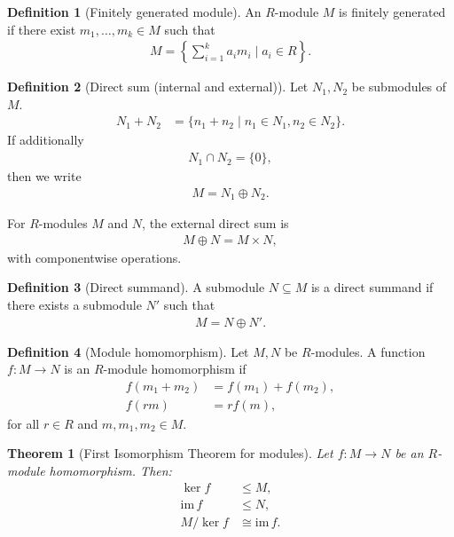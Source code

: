 \documentclass[titlepage]{article}
\theoremstyle{plain}
\newtheorem{theorem}{Theorem}[section]
\theoremstyle{definition}
\newtheorem{definition}{Definition}[section]
\theoremstyle{remark}
\theoremstyle{exercise-style}
\numberwithin{equation}{section}
\numberwithin{theorem}{section}
\numberwithin{remark}{section}
\begin{document}
\begin{definition}[Finitely generated module]
An $R$-module $M$ is finitely generated if there exist $m_1,\dots,m_k \in M$ such that
\begin{align}
M = \left\{ \sum_{i=1}^k a_i m_i \mid a_i \in R \right\}.
\end{align}
\end{definition}

\begin{definition}[Direct sum (internal and external)]
Let $N_1, N_2$ be submodules of $M$.
\begin{align}
N_1 + N_2 &= \{n_1 + n_2 \mid n_1 \in N_1, n_2 \in N_2\}.
\end{align}
If additionally
\begin{align}
N_1 \cap N_2 = \{0\},
\end{align}
then we write
\begin{align}
M = N_1 \oplus N_2.
\end{align}

For $R$-modules $M$ and $N$, the external direct sum is
\begin{align}
M \oplus N = M \times N,
\end{align}
with componentwise operations.
\end{definition}

\begin{definition}[Direct summand]
A submodule $N \subseteq M$ is a direct summand if there exists a submodule $N'$ such that
\begin{align}
M = N \oplus N'.
\end{align}
\end{definition}

\begin{definition}[Module homomorphism]
Let $M,N$ be $R$-modules. A function $f: M \to N$ is an $R$-module homomorphism if
\begin{align}
f(m_1 + m_2) &= f(m_1) + f(m_2), \\
f(rm) &= r f(m),
\end{align}
for all $r \in R$ and $m,m_1,m_2 \in M$.
\end{definition}

\begin{theorem}[First Isomorphism Theorem for modules]
Let $f: M \to N$ be an $R$-module homomorphism. Then:
\begin{align}
\ker f &\leq M, \\
\mathrm{im}\,f &\leq N, \\
M / \ker f &\cong \mathrm{im}\,f.
\end{align}
\end{theorem}
\end{document}
